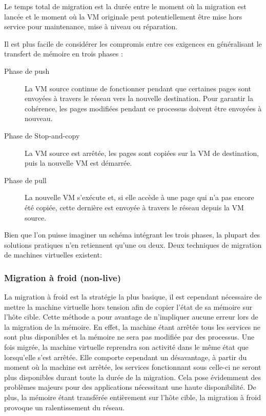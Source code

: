 Le temps total de migration est la durée entre le moment où la migration est lancée et le moment où la VM originale peut potentiellement être mise hors service pour maintenance, mise à niveau ou réparation.

Il est plus facile de considérer les compromis entre ces exigences en généralisant le transfert de mémoire en trois phases :
\begin{description}
    \item[Phase de push]
        La VM source continue de fonctionner pendant que certaines pages sont envoyées à travers le réseau vers la nouvelle destination.
        Pour garantir la cohérence, les pages modifiées pendant ce processus doivent être envoyées à nouveau.
    \item[Phase de Stop-and-copy]
        La VM source est arrêtée, les pages sont copiées sur la VM de destination, puis la nouvelle VM est démarrée.
    \item[Phase de pull]
        La nouvelle VM s'exécute et, si elle accède à une page qui n'a pas encore été copiée, cette dernière est envoyée à travers le réseau depuis la VM source.
\end{description}

Bien que l'on puisse imaginer un schéma intégrant les trois phases, la plupart des solutions pratiques n'en retiennent qu'une ou deux. 
Deux techniques de migration de machines virtuelles existent:

\subsubsection{Migration à froid (non-live)}
La migration à froid est la stratégie la plus basique, il est cependant nécessaire de mettre la machine virtuelle hors tension afin de copier l'état de sa mémoire sur l'hôte cible.
Cette méthode a pour avantage de n'impliquer aucune erreur lors de la migration de la mémoire. En effet, la machine étant arrêtée tous les services ne sont plus disponibles et la mémoire ne sera pas modifiée par des processus.
Une fois migrée, la machine virtuelle reprendra son activité dans le même état que lorsqu'elle s'est arrêtée.
Elle comporte cependant un désavantage, à partir du moment où la machine est arrêtée, les services fonctionnant sous celle-ci ne seront plus disponibles durant toute la durée de la migration.
Cela pose évidemment des problèmes majeurs pour des applications nécessitant une haute disponibilité.
De plus, la mémoire étant transférée entièrement sur l'hôte cible, la migration à froid provoque un ralentissement du réseau. 

